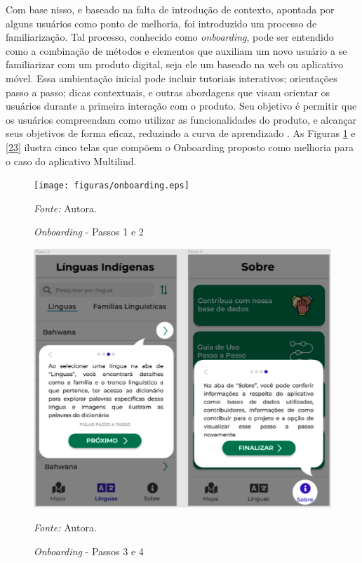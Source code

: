 Com base nisso, e baseado na falta de introdução de contexto, apontada por alguns usuários como ponto de 
melhoria, foi introduzido um processo de familiarização. Tal processo, conhecido como \textit{onboarding}, pode ser entendido como a combinação de métodos e elementos que auxiliam um novo usuário 
a se familiarizar com um produto digital, seja ele um baseado na web ou aplicativo móvel. Essa ambientação inicial pode incluir tutoriais interativos; orientações passo a passo; dicas contextuais, e outras 
abordagens que visam orientar os usuários durante a primeira interação com o produto. Seu objetivo é permitir que os usuários compreendam como utilizar as funcionalidades do produto, e alcançar seus 
objetivos de forma eficaz, reduzindo a curva de aprendizado \cite{renz2014}. As Figuras \ref{fig22} e \ref{23} ilustra cinco telas que compõem o Onboarding proposto como melhoria para o caso do aplicativo Multilind.

\begin{figure}[h!]
	\centering
	\caption{\textit{Onboarding} - Passos 1 e 2}
	\begin{adjustbox}{center}
		\texttt{[image: figuras/onboarding.eps]}
	\end{adjustbox}
	\begin{tablenotes}[flushleft]
		\centering
		\item \textit{Fonte:} Autora.
	\end{tablenotes}
	\label{fig22}
\end{figure}

\newpage

\begin{figure}[h!]
	\centering
	\caption{\textit{Onboarding} - Passos 3 e 4}
	\begin{adjustbox}{center}
		\includegraphics[width=1\textwidth]{figuras/onboarding1.eps}
	\end{adjustbox}
	\begin{tablenotes}[flushleft]
		\centering
		\item \textit{Fonte:} Autora.
	\end{tablenotes}
	\label{fig23}
\end{figure}


